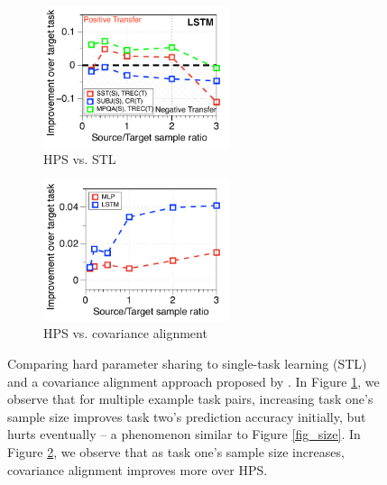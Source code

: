\begin{figure}%
	\begin{subfigure}[t]{0.5\textwidth}
		\centering
		\vspace{0pt}
		\includegraphics[width=0.6\textwidth]{figures/ratio_norm_3_pairs_lstm.pdf}
		\caption{HPS vs. STL}
		\label{fig_ab_data}
	\end{subfigure}\hfill
	\begin{subfigure}[t]{0.5\textwidth}
		\centering
		\vspace{0pt}
		\includegraphics[width=0.6\textwidth]{figures/ratio_alignment_norm_diff_all.pdf}
		\caption{HPS vs. covariance alignment}
		\label{fig_ab_cov}
	\end{subfigure}
	\caption{Comparing hard parameter sharing to single-task learning (STL) and a covariance alignment approach proposed by \citet{WZR20}.
	In Figure \ref{fig_ab_data}, we observe that for multiple example task pairs, increasing task one's sample size improves task two's prediction accuracy initially, but hurts eventually -- a phenomenon similar  to Figure \ref{fig_size}.
	In Figure \ref{fig_ab_cov}, we observe that as task one's sample size increases, covariance alignment improves more over HPS. }
	\label{fig_text}

\end{figure}
